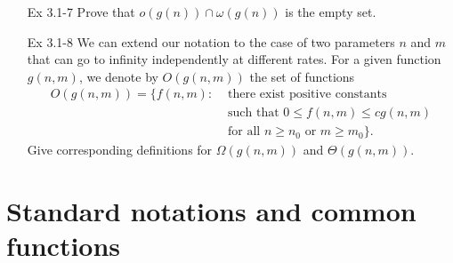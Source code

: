 \documentclass[fontsize=12pt,paper=a4]{book}
\begin{document}
\begin{enumerate}
 \item[Ex 3.1-7]
       Prove that $o(g(n)) \cap \omega(g(n))$ is the empty set.
       
 \item[Ex 3.1-8]
       We can extend our notation to the case of two parameters $n$ and $m$ that can go to infinity independently at different rates. For a given function $g(n, m)$, we denote by $O(g(n, m))$ the set of functions
       \begin{equation*}
        \begin{split}
         O(g(n, m)) = \{f(n,m) : & \text{ there exist positive constants} \\
         & \text{ such that } 0 \leq f(n,m) \leq cg(n,m) \\
         & \text{ for all } n \geq n_0 \text{ or } m \geq m_0 \}.
        \end{split}
       \end{equation*}
       Give corresponding definitions for $\Omega(g(n,m))$ and $\Theta(g(n,m))$.
\end{enumerate}

\section{Standard notations and common functions}
\end{document}
